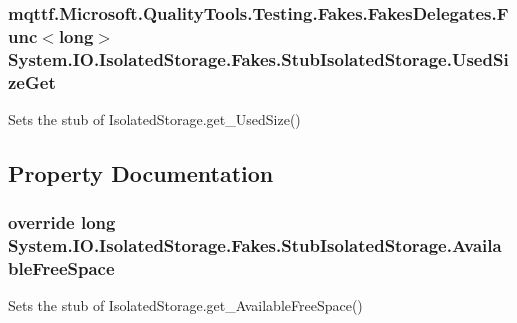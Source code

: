 \hypertarget{class_system_1_1_i_o_1_1_isolated_storage_1_1_fakes_1_1_stub_isolated_storage_ac7206f93f5a535b14740e71e59a47aae}{
\subsubsection[{Used\-Size\-Get}]{\setlength{\rightskip}{0pt plus 5cm}mqttf.\-Microsoft.\-Quality\-Tools.\-Testing.\-Fakes.\-Fakes\-Delegates.\-Func$<$long$>$ System.\-I\-O.\-Isolated\-Storage.\-Fakes.\-Stub\-Isolated\-Storage.\-Used\-Size\-Get}}\label{class_system_1_1_i_o_1_1_isolated_storage_1_1_fakes_1_1_stub_isolated_storage_ac7206f93f5a535b14740e71e59a47aae}


Sets the stub of Isolated\-Storage.\-get\-\_\-\-Used\-Size()



\subsection{Property Documentation}
\hypertarget{class_system_1_1_i_o_1_1_isolated_storage_1_1_fakes_1_1_stub_isolated_storage_a4b15e469aeba32bc640a07dbf19bcfdf}{
\subsubsection[{Available\-Free\-Space}]{\setlength{\rightskip}{0pt plus 5cm}override long System.\-I\-O.\-Isolated\-Storage.\-Fakes.\-Stub\-Isolated\-Storage.\-Available\-Free\-Space\hspace{0.3cm}{\ttfamily [get]}}}\label{class_system_1_1_i_o_1_1_isolated_storage_1_1_fakes_1_1_stub_isolated_storage_a4b15e469aeba32bc640a07dbf19bcfdf}


Sets the stub of Isolated\-Storage.\-get\-\_\-\-Available\-Free\-Space()

